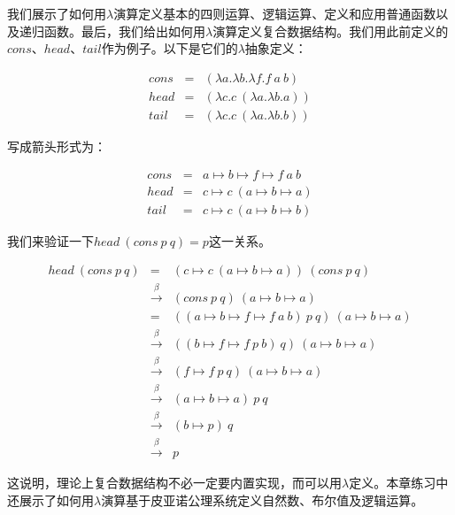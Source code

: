 \documentclass[UTF8]{article}
\begin{document}
我们展示了如何用$\lambda$演算定义基本的四则运算、逻辑运算、定义和应用普通函数以及递归函数。最后，我们给出如何用$\lambda$演算定义复合数据结构。我们用此前定义的$cons$、$head$、$tail$作为例子。以下是它们的$\lambda$抽象定义：

\[
\begin{array}{rcl}
cons & = & (\lambda a . \lambda b . \lambda f . f\ a\ b) \\
head & = & (\lambda c . c\ (\lambda a . \lambda b . a)) \\
tail & = & (\lambda c . c\ (\lambda a . \lambda b . b))
\end{array}
\]

写成箭头形式为：

\[
\begin{array}{rcl}
cons & = & a \mapsto b \mapsto f \mapsto f\ a\ b \\
head & = & c \mapsto c\ (a \mapsto b \mapsto a) \\
tail & = & c \mapsto c\ (a \mapsto b \mapsto b)
\end{array}
\]

我们来验证一下$head\ (cons\ p\ q) = p$这一关系。

\[
\begin{array}{rcl}
head\ (cons\ p\ q) & = & (c \mapsto c\ (a \mapsto b \mapsto a))\ (cons\ p\ q) \\
                   & \xrightarrow{\beta} & (cons\ p\ q)\ (a \mapsto b \mapsto a) \\
                   & = & ((a \mapsto b \mapsto f \mapsto f\ a\ b)\ p\ q)\ (a \mapsto b \mapsto a) \\
                   & \xrightarrow{\beta} & ((b \mapsto f \mapsto f\ p\ b)\ q)\ (a \mapsto b \mapsto a) \\
                   & \xrightarrow{\beta} & (f \mapsto f\ p\ q)\ (a \mapsto b \mapsto a) \\
                   & \xrightarrow{\beta} & (a \mapsto b \mapsto a)\ p\ q \\
                   & \xrightarrow{\beta} & (b \mapsto p)\ q \\
                   & \xrightarrow{\beta} & p
\end{array}
\]

这说明，理论上复合数据结构不必一定要内置实现，而可以用$\lambda$定义。本章练习中还展示了如何用$\lambda$演算基于皮亚诺公理系统定义自然数、布尔值及逻辑运算。
\end{document}
